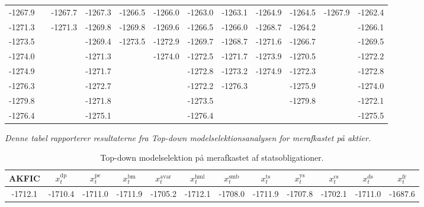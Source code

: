\documentclass[
  a4paper,
  oneside]{memoir}
\begin{document}
\begin{landscape}
\begin{table}[H]
\begin{threeparttable}
\begin{tabular}[t]{cccccccccccc}
-1267.9 &  & -1267.7 & -1267.3 & -1266.5 & -1266.0 & -1263.0 & -1263.1 & -1264.9 & -1264.5 & -1267.9 & -1262.4\\
 
\rowcolor{gray!6}  -1271.3 &  & -1271.3 & -1269.8 & -1269.8 & -1269.6 & -1266.5 & -1266.0 & -1268.7 & -1264.2 &  & -1266.1\\
 
-1273.5 &  &  & -1269.4 & -1273.5 & -1272.9 & -1269.7 & -1268.7 & -1271.6 & -1266.7 &  & -1269.5\\
 
\rowcolor{gray!6}  -1274.0 &  &  & -1271.3 &  & -1274.0 & -1272.5 & -1271.7 & -1273.9 & -1270.5 &  & -1272.2\\
 
-1274.9 &  &  & -1271.7 &  &  & -1272.8 & -1273.2 & -1274.9 & -1272.3 &  & -1272.8\\
 
\rowcolor{gray!6}  -1276.3 &  &  & -1272.7 &  &  & -1272.2 & -1276.3 &  & -1275.9 &  & -1274.0\\
 
-1279.8 &  &  & -1271.8 &  &  & -1273.5 &  &  & -1279.8 &  & -1272.1\\
 
\rowcolor{gray!6}  -1276.4 &  &  & -1275.1 &  &  & -1276.4 &  &  &  &  & -1275.5\\
\bottomrule
\end{tabular}
\begin{tablenotes}
\item \textit{Denne tabel rapporterer resultaterne fra \textit{Top-down} modelselektionsanalysen for merafkastet på aktier.}
\end{tablenotes}
\end{threeparttable}
\end{table}

\begin{table}[H]

\caption{\label{tab:STEP-S-TABLE}Top-down modelselektion på merafkastet af statsobligationer.}
\centering
\begin{threeparttable}
\begin{tabular}[t]{cccccccccccc}
\toprule
AKFIC & $x_t^{\text{dp}}$ & $x_t^{\text{pe}}$ & $x_t^{\text{bm}}$ & $x_t^{\text{avar}}$ & $x_t^{\text{hml}}$ & $x_t^{\text{smb}}$ & $x_t^{\text{ts}}$ & $x_t^{\text{ys}}$ & $x_t^{\text{cs}}$ & $x_t^{\text{ds}}$ & $x_t^{\text{fr}}$\\
\midrule
\rowcolor{gray!6}  -1712.1 & -1710.4 & -1711.0 & -1711.9 & -1705.2 & -1712.1 & -1708.0 & -1711.9 & -1707.8 & -1702.1 & -1711.0 & -1687.6\\
 

\end{tabular}
\end{threeparttable}
\end{table}
\end{landscape}
\end{document}
